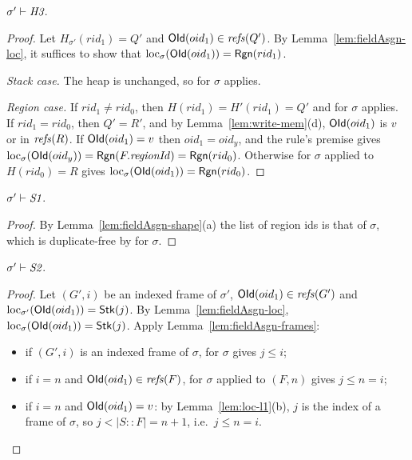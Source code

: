 \begin{lemma}[\inv{H3}] 
$\sigma' \vdash \textit{H3}$.
\end{lemma}
\begin{proof}
Let $H_{\sigma'}(rid_1) = Q'$ and $\mathsf{OId}(oid_1) \in \mathit{refs}(Q')$. By Lemma~\ref{lem:fieldAsgn-loc}, it
suffices to show that $\mathrm{loc}_{\sigma}(\mathsf{OId}(oid_1)) = \mathsf{Rgn}(rid_1)$.

\emph{Stack case.} The heap is unchanged, so  for $\sigma$ applies.

\emph{Region case.} If $rid_1 \ne rid_0$, then $H(rid_1) = H'(rid_1) = Q'$ and  for $\sigma$
applies. If $rid_1 = rid_0$, then $Q' = R'$, and by Lemma~\ref{lem:write-mem}(d), $\mathsf{OId}(oid_1)$ is $v$
or in $\mathit{refs}(R)$. If $\mathsf{OId}(oid_1) = v$ then $oid_1 = oid_y$, and the rule's premise gives
$\mathrm{loc}_{\sigma}(\mathsf{OId}(oid_y)) = \mathsf{Rgn}(F.\mathit{regionId}) = \mathsf{Rgn}(rid_0)$. Otherwise  for $\sigma$ applied to
$H(rid_0) = R$ gives $\mathrm{loc}_{\sigma}(\mathsf{OId}(oid_1)) = \mathsf{Rgn}(rid_0)$.
\end{proof}

\begin{lemma}[\inv{S1}] 
$\sigma' \vdash \textit{S1}$.
\end{lemma}
\begin{proof}
By Lemma~\ref{lem:fieldAsgn-shape}(a) the list of region ids is that of $\sigma$, which is
duplicate-free by  for $\sigma$.
\end{proof}

\begin{lemma}[\inv{S2}] 
$\sigma' \vdash \textit{S2}$.
\end{lemma}
\begin{proof}
Let $(G', i)$ be an indexed frame of $\sigma'$, $\mathsf{OId}(oid_1) \in \mathit{refs}(G')$ and
$\mathrm{loc}_{\sigma'}(\mathsf{OId}(oid_1)) = \mathsf{Stk}(j)$. By Lemma~\ref{lem:fieldAsgn-loc},
$\mathrm{loc}_{\sigma}(\mathsf{OId}(oid_1)) = \mathsf{Stk}(j)$. Apply Lemma~\ref{lem:fieldAsgn-frames}:
\begin{itemize}[nosep]
  \item if $(G', i)$ is an indexed frame of $\sigma$,  for $\sigma$ gives $j \le i$;
  \item if $i = n$ and $\mathsf{OId}(oid_1) \in \mathit{refs}(F)$,  for $\sigma$ applied to $(F, n)$ gives
    $j \le n = i$;
  \item if $i = n$ and $\mathsf{OId}(oid_1) = v$: by Lemma~\ref{lem:loc-l1}(b), $j$ is the index of a frame of
    $\sigma$, so $j < |S :: F| = n + 1$, i.e.\ $j \le n = i$. \qedhere
\end{itemize}
\end{proof}


